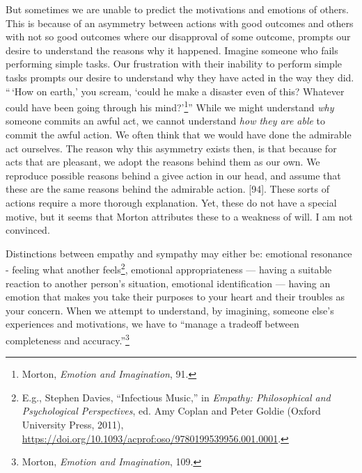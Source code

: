 \documentclass[phdthesis,12pt,final]{wuthesis}
\theoremstyle{definition}
\theoremstyle{definition}
\theoremstyle{definition}
\theoremstyle{definition}
\theoremstyle{remark}
\begin{document}
But sometimes we are unable to predict the motivations and emotions of others. This is because of an asymmetry between actions with good outcomes and others
with not so good outcomes where our disapproval of some outcome, prompts our desire to understand the reasons why it happened. Imagine someone who fails performing simple tasks. Our frustration with their inability to perform simple tasks prompts our desire to understand why they have acted in the way they did. ``\,`How on earth,' you scream, `could he make a disaster even of this? Whatever could have been going through his mind?'\footnote{Morton, \emph{Emotion and {Imagination}}, 91.}'' While we might understand \emph{why} someone commits an awful act, we cannot understand \emph{how they are able} to commit the awful action. We often think that we would have done the admirable act ourselves. The reason why this asymmetry exists then, is that because for acts that are pleasant, we adopt the reasons behind them as our own. We reproduce possible reasons behind a givee action in our head, and assume that these are the same reasons behind the admirable action.
{[}94{]}. These sorts of actions require a more thorough explanation. Yet, these do not have a special motive, but it seems that Morton attributes these to a weakness of will. I am not convinced.

Distinctions between empathy and sympathy may either be: emotional resonance - feeling what another feels\footnote{E.g., Stephen Davies, {``Infectious {Music},''} in \emph{Empathy: {Philosophical} and {Psychological Perspectives}}, ed. Amy Coplan and Peter Goldie (Oxford University Press, 2011), \url{https://doi.org/10.1093/acprof:oso/9780199539956.001.0001}.}, emotional appropriateness --- having a suitable reaction to another person's situation, emotional identification --- having an emotion that makes you take their purposes to your heart
and their troubles as your concern. When we attempt to understand, by imagining, someone else's experiences and motivations, we have to
``manage a tradeoff between completeness and accuracy.''\footnote{Morton, \emph{Emotion and {Imagination}}, 109.}
\end{document}
